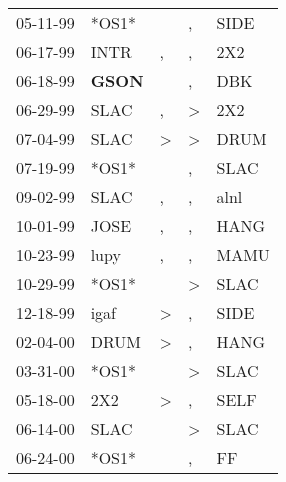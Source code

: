 \begin{supertabular}{p{0.07\textwidth}p{0.06\textwidth}p{0.02\textwidth}p{0.02\textwidth}p{0.06\textwidth}}
 05-11-99\textsuperscript{} &                            *OS1* &               &             , &           SIDE\textsuperscript{} \\
 06-17-99\textsuperscript{} &           INTR\textsuperscript{} &             , &             , &            2X2\textsuperscript{} \\
 06-18-99\textsuperscript{} &  \textbf{GSON\textsuperscript{}} &               &             , &            DBK\textsuperscript{} \\
 06-29-99\textsuperscript{} &           SLAC\textsuperscript{} &             , &  \textgreater &            2X2\textsuperscript{} \\
 07-04-99\textsuperscript{} &           SLAC\textsuperscript{} &  \textgreater &  \textgreater &           DRUM\textsuperscript{} \\
 07-19-99\textsuperscript{} &                            *OS1* &               &             , &           SLAC\textsuperscript{} \\
 09-02-99\textsuperscript{} &           SLAC\textsuperscript{} &             , &             , &           alnl\textsuperscript{} \\
 10-01-99\textsuperscript{} &           JOSE\textsuperscript{} &             , &             , &           HANG\textsuperscript{} \\
 10-23-99\textsuperscript{} &           lupy\textsuperscript{} &             , &             , &           MAMU\textsuperscript{} \\
 10-29-99\textsuperscript{} &                            *OS1* &               &  \textgreater &           SLAC\textsuperscript{} \\
 12-18-99\textsuperscript{} &           igaf\textsuperscript{} &  \textgreater &             , &           SIDE\textsuperscript{} \\
 02-04-00\textsuperscript{} &           DRUM\textsuperscript{} &  \textgreater &             , &           HANG\textsuperscript{} \\
 03-31-00\textsuperscript{} &                            *OS1* &               &  \textgreater &           SLAC\textsuperscript{} \\
 05-18-00\textsuperscript{} &            2X2\textsuperscript{} &  \textgreater &             , &           SELF\textsuperscript{} \\
 06-14-00\textsuperscript{} &           SLAC\textsuperscript{} &               &  \textgreater &           SLAC\textsuperscript{} \\
 06-24-00\textsuperscript{} &                            *OS1* &               &             , &             FF\textsuperscript{} \\

\end{supertabular}
